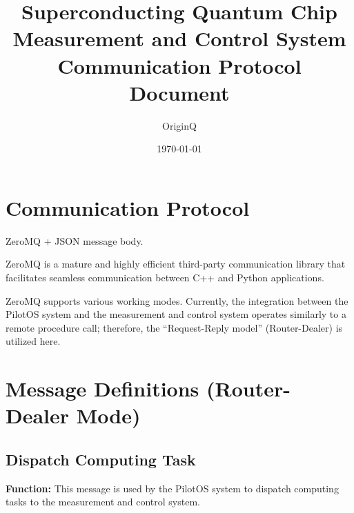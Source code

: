 \documentclass[12pt, a4paper]{article}
\title{\textbf{Superconducting Quantum Chip Measurement and Control System Communication Protocol Document}}
\author{OriginQ}
\date{\today}
\begin{document}
\maketitle

\tableofcontents
\newpage

\section{Communication Protocol}

ZeroMQ + JSON message body.

ZeroMQ is a mature and highly efficient third-party communication library that facilitates seamless communication between C++ and Python applications.

ZeroMQ supports various working modes. Currently, the integration between the PilotOS system and the measurement and control system operates similarly to a remote procedure call; therefore, the ``Request-Reply model'' (Router-Dealer) is utilized here.

\section{Message Definitions (Router-Dealer Mode)}

\subsection{Dispatch Computing Task}

\textbf{Function:} This message is used by the PilotOS system to dispatch computing tasks to the measurement and control system.
\end{document}
